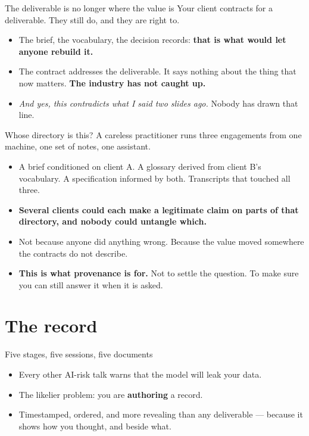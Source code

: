 \documentclass[aspectratio=169,t]{beamer}
\begin{document}
\begin{frame}{The deliverable is no longer where the value is}
    Your client contracts for a deliverable. They still do, and they are right to.
    \begin{itemize}
        \item The brief, the vocabulary, the decision records:
              \textbf{that is what would let anyone rebuild it.}
        \item The contract addresses the deliverable. It says nothing about the
              thing that now matters. \textbf{The industry has not caught up.}
        \item \emph{And yes, this contradicts what I said two slides ago.}
              Nobody has drawn that line.
    \end{itemize}
\end{frame}

\begin{frame}{Whose directory is this?}
    A careless practitioner runs three engagements from one machine, one set of
    notes, one assistant.
    \begin{itemize}
        \item A brief conditioned on client A. A glossary derived from client B's
              vocabulary. A specification informed by both. Transcripts that
              touched all three.
        \item \textbf{Several clients could each make a legitimate claim on parts
              of that directory, and nobody could untangle which.}
        \item Not because anyone did anything wrong. Because the value moved
              somewhere the contracts do not describe.
        \item \textbf{This is what provenance is for.} Not to settle the question.
              To make sure you can still answer it when it is asked.
    \end{itemize}
\end{frame}

\section{The record}

\begin{frame}{Five stages, five sessions, five documents}
    \begin{itemize}
        \item Every other AI-risk talk warns that the model will leak your data.
        \item The likelier problem: you are \textbf{authoring} a record.
        \item Timestamped, ordered, and more revealing than any deliverable ---
              because it shows how you thought, and beside what.
    \end{itemize}
\end{frame}
\end{document}
